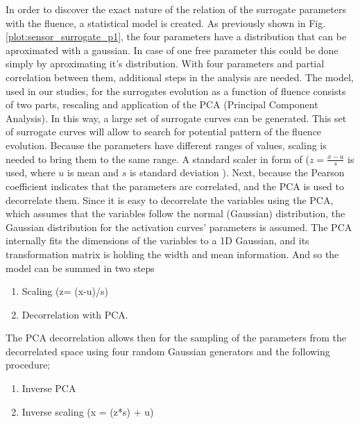 In order to discover the exact nature of the relation of the surrogate parameters with the fluence, a statistical model is created.
As previously shown in Fig. \ref{plot:sensor_surrogate_p1}, the four parameters have a distribution that can be aproximated with a gaussian.
In case of one free parameter this could be done simply by aproximating it's distribution.
With four parameters and partial correlation between them, additional steps in the analysis are needed.
The model, used in our studies, for the surrogates evolution as a function of fluence consists of two parts, rescaling and application of the PCA (Principal Component Analysis). In this way, a large set of surrogate curves can be generated. This set of surrogate curves will allow to search for potential pattern of the fluence evolution.
Because the parameters have different ranges of values, scaling is needed to bring them to the same range. A standard scaler in form of ($z = \frac{x - u}{s}$ is used, where $u$ is mean and $s$ is standard deviation ).
Next, because the Pearson coefficient indicates that the parameters are correlated, and the PCA is used to decorrelate them.
Since it is easy to decorrelate the variables using the PCA, which assumes that the variables follow the normal (Gaussian) distribution, the Gaussian distribution for the activation curves' parameters is assumed.
The PCA internally fits the dimensions of the variables to a 1D Gaussian, and its transformation matrix is holding the width and mean information.
And so the model can be summed in two steps

\begin{enumerate}[noitemsep]
\item Scaling (z= (x-u)/s)
\item Decorrelation with PCA.
\end{enumerate}

The PCA decorrelation allows then for the sampling of the parameters from the decorrelated space using four random Gaussian generators and the following procedure;

\begin{enumerate}[noitemsep]
\item Inverse PCA
\item Inverse scaling (x = (z*s) + u)
\end{enumerate}

